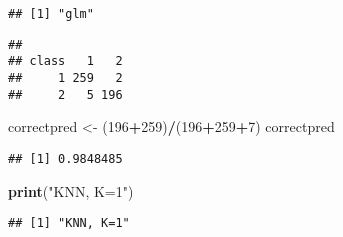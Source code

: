 \documentclass[]{article}
\newenvironment{Shaded}{\begin{snugshade}}{\end{snugshade}}
\newcommand{\KeywordTok}[1]{\textcolor[rgb]{0.13,0.29,0.53}{\textbf{#1}}}
\newcommand{\DataTypeTok}[1]{\textcolor[rgb]{0.13,0.29,0.53}{#1}}
\newcommand{\DecValTok}[1]{\textcolor[rgb]{0.00,0.00,0.81}{#1}}
\newcommand{\StringTok}[1]{\textcolor[rgb]{0.31,0.60,0.02}{#1}}
\newcommand{\CommentTok}[1]{\textcolor[rgb]{0.56,0.35,0.01}{\textit{#1}}}
\newcommand{\OperatorTok}[1]{\textcolor[rgb]{0.81,0.36,0.00}{\textbf{#1}}}
\newcommand{\NormalTok}[1]{#1}
\begin{document}
\begin{verbatim}
## [1] "glm"
\end{verbatim}

\begin{Shaded}
\end{Shaded}

\begin{verbatim}
##      
## class   1   2
##     1 259   2
##     2   5 196
\end{verbatim}

\begin{Shaded}
\begin{Highlighting}[]
\NormalTok{correctpred <-}\StringTok{ }\NormalTok{(}\DecValTok{196}\OperatorTok{+}\DecValTok{259}\NormalTok{)}\OperatorTok{/}\NormalTok{(}\DecValTok{196}\OperatorTok{+}\DecValTok{259}\OperatorTok{+}\DecValTok{7}\NormalTok{)}
\NormalTok{correctpred}
\end{Highlighting}
\end{Shaded}

\begin{verbatim}
## [1] 0.9848485
\end{verbatim}

\begin{Shaded}
\begin{Highlighting}[]
\KeywordTok{print}\NormalTok{(}\StringTok{"KNN, K=1"}\NormalTok{)}
\end{Highlighting}
\end{Shaded}

\begin{verbatim}
## [1] "KNN, K=1"
\end{verbatim}
\end{document}
